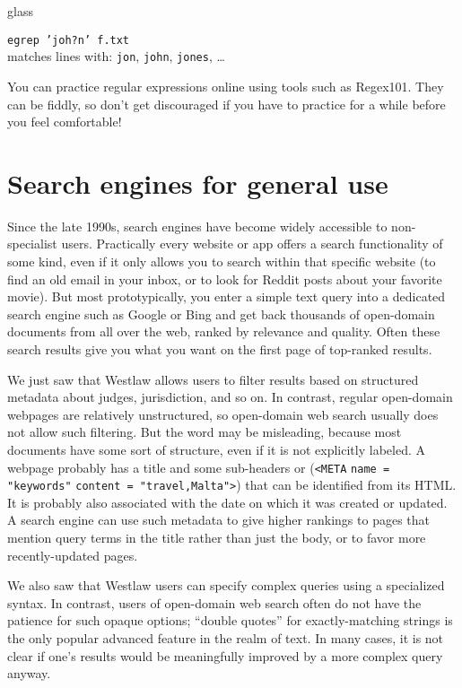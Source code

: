 \begin{tblsfilledsymbol}{}{glass}
\begin{underthehood}
\begin{itemize}
    \texttt{egrep 'joh?n' f.txt}\\[1ex]
    matches lines with:
    \texttt{jon}, \texttt{john}, \texttt{jones}, \ldots

  \end{itemize}
  
You can practice regular expressions online using tools such as Regex101. They can be fiddly, so don't get discouraged if you have to practice for a while before you feel comfortable!

\end{underthehood}
\end{tblsfilledsymbol}



\section{Search engines for general use}

Since the late 1990s, search engines have become widely accessible to non-specialist users.  Practically every website or app offers a search functionality of some kind, even if it only allows you to search within that specific website (to find an old email in your inbox, or to look for Reddit posts about your favorite movie).  But most prototypically, you enter a  simple text query into a dedicated search engine such as Google or Bing and get back thousands of open-domain documents from all over the web, ranked by relevance and quality.  Often these search results give you what you want on the first page of top-ranked results.

We just saw that Westlaw allows users to filter results based on structured metadata about judges, jurisdiction, and so on.  In contrast, regular open-domain webpages are relatively unstructured, so open-domain web search usually does not allow such  filtering.  But  the word   may be misleading, because most documents have some sort of structure, even if it is not explicitly labeled.  A webpage probably has a title and  some sub-headers or  (\texttt{<META} \texttt{name = "keywords"} \texttt{content = "travel,Malta">}) that can be identified from its HTML.  It is probably also  associated with the date on which it was created or updated.  A search engine can use such metadata to give higher rankings to pages that mention query terms in the title rather than just the body, or to favor more recently-updated pages.  

We also saw that Westlaw users can specify complex queries using a specialized syntax.  In contrast,  users of open-domain web search often do not have the patience for such opaque options; ``double quotes'' for exactly-matching strings is the only  popular advanced feature in the realm of text.  In many cases, it is not clear if one's results would be meaningfully improved by a more complex query anyway.

